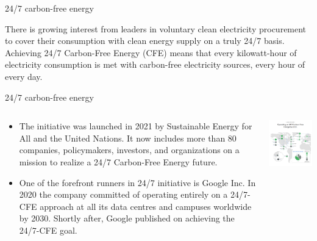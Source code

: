 \begin{frame}{24/7 carbon-free energy}

  \centering

  There is growing interest from leaders in voluntary clean
  electricity procurement to cover their consumption 
  with clean energy supply on a \alert{truly 24/7 basis}. \\
  \vspace{0.3cm}
  Achieving 24/7 Carbon-Free Energy (CFE) means that every kilowatt-hour of electricity consumption is met
  with carbon-free electricity sources, \alert{every hour of every day}.
  
\end{frame}


\begin{frame}{24/7 carbon-free energy}
  
  \begin{columns}[T]
  \begin{column}{8cm}

    \begin{itemize}
    \item The  
    initiative was launched in 2021 by Sustainable Energy for All and the United Nations. 
    It now includes more than 80 companies, policymakers, investors, and organizations 
    on a mission to realize a 24/7 Carbon-Free Energy future. 

    \item One of the forefront runners in 24/7 initiative is Google Inc. In 2020 the company committed 
    of operating entirely on a 24/7-CFE approach at all its data centres and campuses worldwide by 2030. 
    Shortly after, Google published 
    on achieving the 24/7-CFE goal.

    \end{itemize}
  \end{column}

  \begin{column}{8cm}
    \centering
    \includegraphics[width=7.5cm]{images/247-google-web.png}
    \vspace{.1cm}
  \end{column}


\end{columns}
\end{frame}
